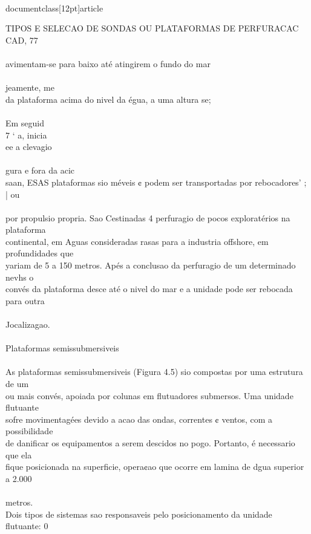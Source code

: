 \\documentclass[12pt]{article}
\begin{document}
TIPOS E SELECAO DE SONDAS OU PLATAFORMAS DE PERFURACAC\\
CAD, 77\\
\\
avimentam-se para baixo até atingirem o fundo do mar\\
\\
jeamente, me\\
da plataforma acima do nivel da égua, a uma altura se;\\
\\
Em seguid\\
7 ‘ a, inicia\\
ee a clevagio\\
\\
gura e fora da acic\\
saan, ESAS plataformas sio méveis ¢ podem ser transportadas por rebocadores’ ;\\
| ou\\
\\
por propulsio propria. Sao Cestinadas 4 perfuragio de pocos exploratérios na plataforma\\
continental, em Aguas consideradas rasas para a industria offshore, em profundidades que\\
yariam de 5 a 150 metros. Apés a conclusao da perfuragio de um determinado nevhs o\\
convés da plataforma desce até o nivel do mar e a unidade pode ser rebocada para outra\\
\\
Jocalizagao.\\
\\
Plataformas semissubmersiveis\\
\\
As plataformas semissubmersiveis (Figura 4.5) sio compostas por uma estrutura de um\\
ou mais convés, apoiada por colunas em flutuadores submersos. Uma unidade flutuante\\
sofre movimentagées devido a acao das ondas, correntes ¢ ventos, com a possibilidade\\
de danificar os equipamentos a serem descidos no pogo. Portanto, é necessario que ela\\
fique posicionada na superficie, opera¢ao que ocorre em lamina de dgua superior a 2.000\\
\\
metros.\\
Dois tipos de sistemas sao responsaveis pelo posicionamento da unidade flutuante: 0\\
\end{document}
